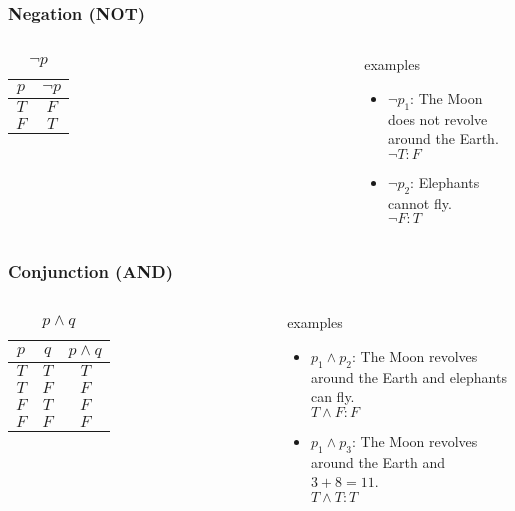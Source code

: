\documentclass[dvipsnames]{beamer}
\begin{document}
\begin{frame}
  \frametitle{Negation (NOT)}

  \begin{columns}
    \begin{table}
      \caption{$\neg p$}
      \begin{tabular}{|c||c|}\hline
        $p$ & $\neg p$\\\hline\hline
        $T$ & $F$\\\hline
        $F$ & $T$\\\hline
      \end{tabular}
    \end{table}

    \pause
    \begin{exampleblock}{examples}
      \begin{itemize}
        \item $\neg p_1$: The Moon does not revolve\\
          around the Earth.\\
          $\neg T : F$
        \item $\neg p_2$: Elephants cannot fly.\\
          $\neg F : T$
      \end{itemize}
    \end{exampleblock}
  \end{columns}
\end{frame}

\begin{frame}
  \frametitle{Conjunction (AND)}

  \begin{columns}
    \begin{table}
      \caption{$p \wedge q$}
      \begin{tabular}{|c|c||c|}\hline
        $p$ & $q$ & $p \wedge q$\\\hline\hline
        $T$ & $T$ & $T$\\\hline
        $T$ & $F$ & $F$\\\hline
        $F$ & $T$ & $F$\\\hline
        $F$ & $F$ & $F$\\\hline
      \end{tabular}
    \end{table}

    \pause
    \begin{exampleblock}{examples}
      \begin{itemize}
        \item $p_1 \wedge p_2$: The Moon revolves around the Earth and elephants
          can fly.\\
          $T \wedge F : F$
        \item $p_1 \wedge p_3$: The Moon revolves around the Earth and $3+8=11$.\\
          $T \wedge T : T$
      \end{itemize}
    \end{exampleblock}
  \end{columns}
\end{frame}
\end{document}
